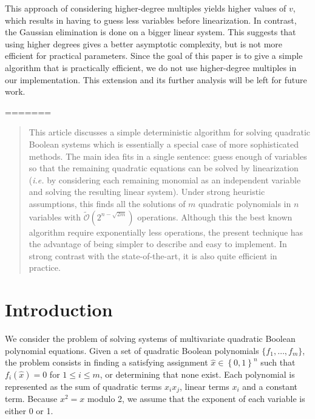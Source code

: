 \documentclass[a4paper,UKenglish,cleveref, autoref]{lipics-v2019}
\newcommand{\bits}{\left\{0, 1\right\}}
\newcommand{\bigOsoft}[1]{\ensuremath{\mathcal{\tilde O}\left( #1 \right)} }
\begin{document}
	
	This approach of considering higher-degree multiples yields higher values of $v$, which results in having to guess less variables before linearization. In contrast, the Gaussian elimination is done on a bigger linear system. This suggests that using higher degrees gives a better asymptotic complexity, but is not more efficient for practical parameters. Since the goal of this paper is to give a simple algorithm that is practically efficient, we do not use higher-degree multiples in our implementation. This extension and its further analysis will be left for future work. 
	
	
	
	
	
=======
\maketitle

\begin{abstract}
  This article discusses a simple deterministic algorithm for solving quadratic
  Boolean systems which is essentially a special case of more sophisticated
  methods. The main idea fits in a single sentence: guess enough of variables so
  that the remaining quadratic equations can be solved by linearization
  (\textit{i.e.} by considering each remaining monomial as an independent
  variable and solving the resulting linear system). Under strong heuristic
  assumptions, this finds all the solutions of $m$ quadratic polynomials in $n$
  variables with $\bigOsoft{2^{n-\sqrt{2m}}}$ operations. Although this the best
  known algorithm require exponentially less operations, the present technique
  has the advantage of being simpler to describe and easy to implement. In
  strong contrast with the state-of-the-art, it is also quite efficient in
  practice.
\end{abstract}


\clearpage

\section{Introduction}

We consider the problem of solving systems of multivariate quadratic Boolean
polynomial equations. Given a set of quadratic Boolean polynomials
$\{f_1, \dots, f_m\}$, the problem consists in finding a satisfying assignment
$\hat x \in \bits^n$ such that $f_i(\hat x) = 0$ for $1 \leq i \leq m$, or
determining that none exist. Each polynomial is represented as the sum of
quadratic terms $x_i x_j$, linear terms $x_i$ and a constant term. Because
$x^2 = x$ modulo 2, we assume that the exponent of each variable is either 0 or
1.
\end{document}

